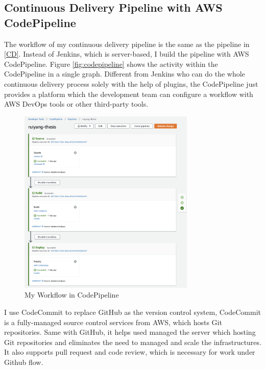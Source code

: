 \subsection{Continuous Delivery Pipeline with AWS CodePipeline}
The workflow of my continuous delivery pipeline is the same as the pipeline in \ref{CD}. Instead of Jenkins, which is server-based, I build the pipeline with AWS CodePipeline. Figure \ref{fig:codepipeline} shows the activity within the CodePipeline in a single graph. Different from Jenkins who can do the whole continuous delivery process solely with the help of plugins, the CodePipeline just provides a platform which the development team can configure a workflow with AWS DevOps tools or other third-party tools. 
\begin{figure}[h]
     \centering
     \includegraphics[width=0.75\textwidth]{pics/cp-interface.png}
     \caption{My Workflow in CodePipeline}
     \label{fig:cp-edit}
    \end{figure}
\par
I use CodeCommit to replace GitHub as the version control system, CodeCommit is a fully-managed source control services \cite{AWSCodeC33:online} from AWS, which hosts Git repositories. Same with GitHub, it helps used managed the server which hosting Git repositories and eliminates the need to managed and scale the infrastructures. It also supports pull request and code review, which is necessary for work under Github flow. 
